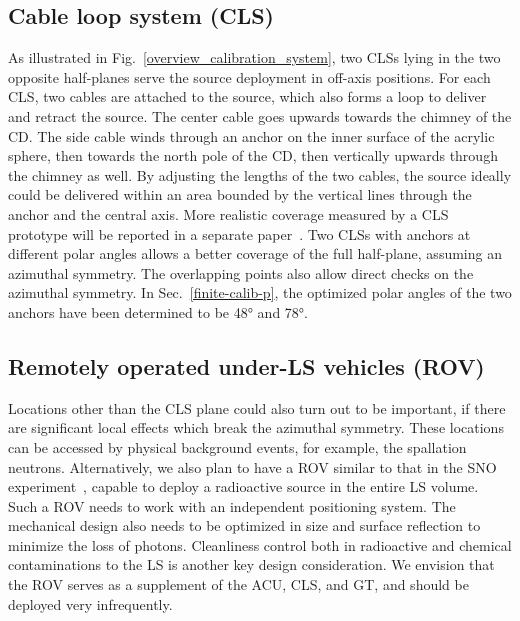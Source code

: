 \documentclass[a4paper,10pt,twoside]{cpc-hepnp}
\begin{document}
\begin{CJK*}{GB}{gbsn}
\begin{multicols}{2}
\subsection{Cable loop system (CLS)}
As illustrated in Fig.~\ref{overview_calibration_system}, two CLSs
lying in the two opposite half-planes serve the source deployment in
off-axis positions. For each CLS, two cables are attached to the
source, which also forms a loop to deliver and retract the source. The
center cable goes upwards towards the chimney of the CD. The side
cable winds through an anchor on the inner surface of the acrylic
sphere, then towards the north pole of the CD, then vertically upwards
through the chimney as well. By adjusting the lengths of the two
cables, the source ideally could be delivered within an area bounded
by the vertical lines through the anchor and the central axis. More
realistic coverage measured by a CLS prototype will be reported in a
separate paper~\cite{zhangyuanyuan-new-paper}. Two CLSs with anchors at
different polar angles allows a better coverage of the full
half-plane, assuming an azimuthal symmetry. The overlapping points
also allow direct checks on the azimuthal symmetry. In
Sec.~\ref{finite-calib-p}, the optimized polar angles of the two
anchors have been determined to be \ang{48} and \ang{78}.

\subsection{Remotely operated under-LS vehicles (ROV)}
Locations other than the CLS plane could also turn out to be
important, if there are significant local effects which break the
azimuthal symmetry. These locations can be accessed by physical
background events, for example, the spallation
neutrons. Alternatively, we also plan to have a ROV similar to that in
the SNO experiment~\cite{SNO-ROV}, capable to deploy a radioactive source
in the entire LS volume. Such a ROV needs to work with an independent
positioning system. The mechanical design also needs to be optimized
in size and surface reflection to minimize the loss of
photons. Cleanliness control both in radioactive and chemical
contaminations to the LS is another key design consideration. We
envision that the ROV serves as a supplement of the ACU, CLS, and GT,
and should be deployed very infrequently.


\end{multicols}
\end{CJK*}
\end{document}
